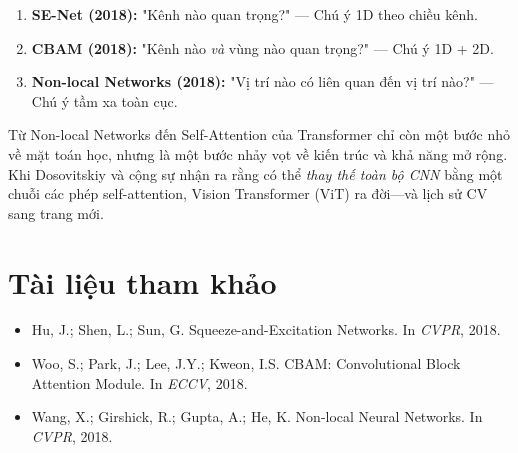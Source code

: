 \begin{enumerate}
    \item \textbf{SE-Net (2018):} "Kênh nào quan trọng?" — Chú ý 1D theo chiều kênh.
    \item \textbf{CBAM (2018):} "Kênh nào \textit{và} vùng nào quan trọng?" — Chú ý 1D + 2D.
    \item \textbf{Non-local Networks (2018):} "Vị trí nào có liên quan đến vị trí nào?" — Chú ý tầm xa toàn cục.
\end{enumerate}

Từ Non-local Networks đến Self-Attention của Transformer chỉ còn một bước nhỏ về mặt toán học, nhưng là một bước nhảy vọt về kiến trúc và khả năng mở rộng. Khi Dosovitskiy và cộng sự nhận ra rằng có thể \textit{thay thế toàn bộ CNN} bằng một chuỗi các phép self-attention, Vision Transformer (ViT) ra đời—và lịch sử CV sang trang mới.

\section*{Tài liệu tham khảo}
\begin{itemize}
    \item[1] Hu, J.; Shen, L.; Sun, G. Squeeze-and-Excitation Networks. In \textit{CVPR}, 2018.
    \item[2] Woo, S.; Park, J.; Lee, J.Y.; Kweon, I.S. CBAM: Convolutional Block Attention Module. In \textit{ECCV}, 2018.
    \item[3] Wang, X.; Girshick, R.; Gupta, A.; He, K. Non-local Neural Networks. In \textit{CVPR}, 2018.
\end{itemize}
